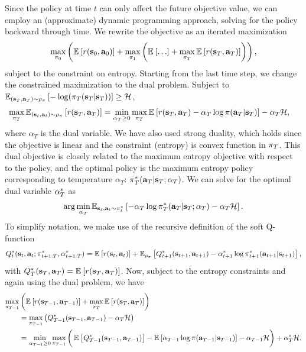 Since the policy at time $t$ can only affect the future objective value, we can employ an (approximate) dynamic programming approach, solving for the policy backward through time. We rewrite the objective as an iterated maximization
\begin{equation}
    \max_{\pi_0} \left( \operatorname{\mathbb{E}}_{}\left[r(\mathbf{s}_0, \mathbf{a}_0)\right] + \max_{\pi_1} \left( \operatorname{\mathbb{E}}_{}\left[ \ldots \right] + \max_{\pi_T} \operatorname{\mathbb{E}}_{}\left[r(\mathbf{s}_T, \mathbf{a}_T)\right] \right) \right),
\end{equation}
subject to the constraint on entropy. Starting from the last time step, we change the constrained maximization to the dual problem. Subject to $\operatorname{\mathbb{E}}_{({\mathbf{s}_T}, {\mathbf{a}_T})\sim\rho_\pi}\left[-\log(\pi_T({\mathbf{s}_T}|{\mathbf{s}_T}))\right] \geq \mathcal{H}$,
\begin{align}
    \max_{\pi_T} &\operatorname{\mathbb{E}}_{({\mathbf{s}_t}, {\mathbf{a}_t})\sim\rho_\pi}\left[r(\mathbf{s}_T, \mathbf{a}_T)\right] = \min_{\alpha_T \geq 0} \max_{\pi_T} \operatorname{\mathbb{E}}_{}\left[r(\mathbf{s}_T, \mathbf{a}_T) - \alpha_T \log \pi(\mathbf{a}_T|\mathbf{s}_T)\right] -\alpha_T \mathcal{H},
\end{align}
where $\alpha_T$ is the dual variable. We have also used strong duality, which holds since the objective is linear and the constraint (entropy) is convex function in $\pi_T$. This dual objective is closely related to the maximum entropy objective with respect to the policy, and the optimal policy is the maximum entropy policy corresponding to temperature $\alpha_T$: $\pi_T^*(\mathbf{a}_T | \mathbf{s}_T; \alpha_T)$. We can solve for the optimal dual variable $\alpha_T^*$ as
\begin{align}
    \arg \min_{\alpha_T} \operatorname{\mathbb{E}}_{{\mathbf{s}_t}, {\mathbf{a}_t}\sim \pi_t^*}\left[- \alpha_T\log\pi_T^*(\mathbf{a}_T|\mathbf{s}_T; \alpha_T) - \alpha_T \mathcal{H}\right].
\end{align}
To simplify notation, we make use of the recursive definition of the soft Q-function
\begin{align}
   Q_t^*({\mathbf{s}_t}, {\mathbf{a}_t}; \pi^*_{t+1:T}, \alpha^*_{t+1:T}) = \operatorname{\mathbb{E}}_{}\left[r({\mathbf{s}_t}, {\mathbf{a}_t})\right] + \operatorname{\mathbb{E}}_{\rho_\pi}\left[Q_{t+1}^* (\mathbf{s}_{t+1}, \mathbf{a}_{t+1}) - \alpha_{t+1}^*\log \pi_{t+1}^*(\mathbf{a}_{t+1}|\mathbf{s}_{t+1})\right],
\end{align}
with $Q^*_{T}(\mathbf{s}_T, \mathbf{a}_T) = \operatorname{\mathbb{E}}_{}\left[r(\mathbf{s}_T, \mathbf{a}_T)\right]$. Now, subject to the entropy constraints and again using the dual problem, we have
\begin{align}
    \max_{\pi_{T-1}} &\left( \operatorname{\mathbb{E}}_{}\left[r(\mathbf{s}_{T-1}, \mathbf{a}_{T-1}) \right] + \max_{\pi_T} \operatorname{\mathbb{E}}_{}\left[r(\mathbf{s}_T, \mathbf{a}_T)\right] \right)\\
    &= \max_{\pi_{T-1}} \left( Q^*_{T-1}(\mathbf{s}_{T-1}, \mathbf{a}_{T-1}) - \alpha_T \mathcal{H} \right)\notag\\
    &= \min_{\alpha_{T-1} \geq 0} \max_{\pi_{T-1}} \bigg( \operatorname{\mathbb{E}}_{}\left[Q^*_{T-1}(\mathbf{s}_{T-1}, \mathbf{a}_{T-1})\right] - \operatorname{\mathbb{E}}_{}\left[\alpha_{T-1} \log \pi(\mathbf{a}_{T-1}|\mathbf{s}_{T-1})\right] - \alpha_{T-1}  \mathcal{H} \bigg) + \alpha^*_T \mathcal{H}\notag.
\end{align}
